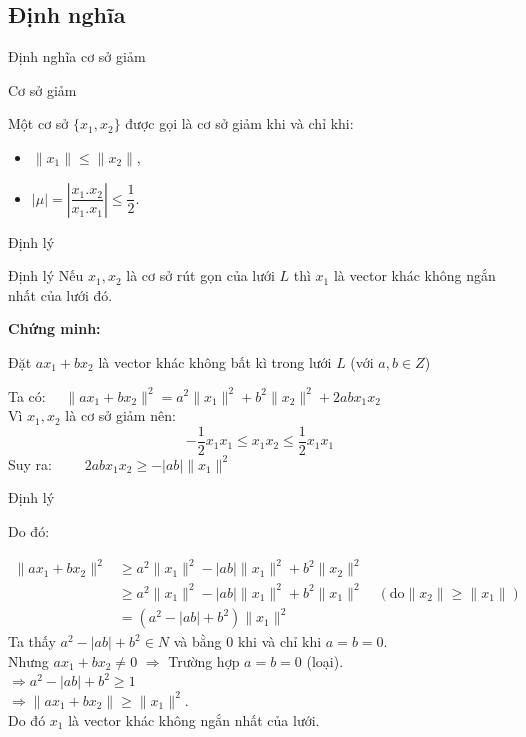 \documentclass{beamer}
\numberwithin{equation}{section}
\begin{document}
\subsection{Định nghĩa}
\begin{frame}{Định nghĩa cơ sở giảm}
\begin{block}{Cơ sở giảm}

Một cơ sở $\{x_1, x_2\}$ được gọi là cơ sở giảm khi và chỉ khi:

\begin{itemize}
\item $\|x_1\| \leq \|x_2\|$,
\item $|\mu| = \left|\dfrac{x_1.x_2}{x_1.x_1}\right| \leq \dfrac{1}{2}$.
\end{itemize}

\end{block}
\end{frame}
\begin{frame}{Định lý}
\begin{block}{Định lý}
Nếu $x_1, x_2$ là cơ sở rút gọn của lưới $L$
thì $x_1$ là vector khác không ngắn nhất của lưới đó.
\end{block}

\textbf{Chứng minh:}

Đặt $ax_1 + bx_2$ là vector khác không bất kì trong lưới $L$ (với $a, b \in Z$)

Ta có: \hspace{4cm}$ \quad \|ax_1 + bx_2\|^2 = a^2\|x_1\|^2 + b^2\|x_2\|^2 + 2abx_1x_2$\\
Vì $x_1, x_2$ là cơ sở giảm nên: $$-\frac{1}{2}x_1x_1 \leq x_1x_2 \leq \frac{1}{2}x_1x_1 $$
Suy ra: \hspace{3cm} $\qquad 2abx_1x_2 \geq -|ab|\|x_1\|^2 $

\end{frame}
\begin{frame}{Định lý}

Do đó:

$$
\begin{aligned}
\|ax_1 + bx_2\|^2 &\geq a^2\|x_1\|^2 - |ab|\|x_1\|^2 + b^2\|x_2\|^2 \\
& \geq a^2\|x_1\|^2 - |ab|\|x_1\|^2 + b^2\|x_1\|^2 \quad (\text{do}\|x_2\| \geq \|x_1\|)\\
& = (a^2 - |ab| + b^2) \|x_1\|^2
\end{aligned}
$$
Ta thấy $a^2 - |ab| + b^2 \in N$ và bằng 0 khi và chỉ khi $a = b = 0$.\\
Nhưng \quad $ax_1 + bx_2 \ne 0$ \qquad $\Rightarrow$ \qquad Trường hợp $a = b = 0$ (loại).\\
\hspace*{3cm}$\Rightarrow a^2 - |ab| + b^2 \geq 1$\\
\hspace*{3cm}$ \Rightarrow \|ax_1 + bx_2\| \geq \|x_1\|^2$.\\
Do đó $x_1$ là vector khác không ngắn nhất của lưới.
\end{frame}
\end{document}
